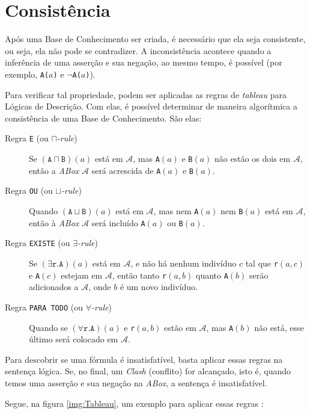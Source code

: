 \section{Consistência}

Após uma Base de Conhecimento ser criada, é necessário que ela seja consistente, ou seja, ela não pode se contradizer. A inconsistência acontece quando a inferência de uma asserção e sua negação, ao mesmo tempo, é possível (por exemplo, \texttt{A($ a $)} e $ \lnot $\texttt{A($ a $)}).

Para verificar tal propriedade, podem ser aplicadas as regras de \textit{tableau} para Lógicas de Descrição. Com elas, é possível determinar de maneira algorítmica a consistência de uma Base de Conhecimento. São elas:

\begin{description}
	\item[Regra \texttt{E} (ou \textit{$ \sqcap $-rule})] Se $(\texttt{A} \sqcap \texttt{B})(a)$ está em $ \mathcal{A} $, mas \texttt{A}$ (a) $ e \texttt{B}$ (a) $ não estão os dois em $ \mathcal{A} $, então a \textit{ABox} $ \mathcal{A} $ será acrescida de \texttt{A}$ (a) $ e \texttt{B}$ (a) $.
	\item[Regra \texttt{OU} (ou \textit{$ \sqcup $-rule})] Quando $(\texttt{A} \sqcup \texttt{B})(a)$ está em $ \mathcal{A} $, mas nem \texttt{A}$ (a) $ nem \texttt{B}$ (a) $ está em $ \mathcal{A} $, então à \textit{ABox} $ \mathcal{A} $ será incluído \texttt{A}$ (a) $ ou \texttt{B}$ (a) $.
	\item[Regra \texttt{EXISTE} (ou \textit{$ \exists $-rule})] Se $(\exists \texttt{r.A})(a)$ está em $ \mathcal{A} $, e não há nenhum indivíduo $ c $ tal que \texttt{r}$ (a,c) $ e \texttt{A}$ (c) $ estejam em $ \mathcal{A} $, então tanto \texttt{r}$ (a,b) $ quanto \texttt{A}$ (b) $ serão adicionados a $ \mathcal{A} $, onde $ b $ é um novo indivíduo.
	\item[Regra \texttt{PARA TODO} (ou \textit{$ \forall $-rule})] Quando se $(\forall \texttt{r.A})(a)$ e \texttt{r}$ (a,b) $ estão em $ \mathcal{A} $, mas \texttt{A}$ (b) $ não está, esse último será colocado em $ \mathcal{A} $.  
\end{description}

Para descobrir se uma fórmula é insatisfatível, basta aplicar essas regras na sentença lógica. Se, no final, um \textit{Clash} (conflito) for alcançado, isto é, quando temos uma asserção e sua negação na \textit{ABox}, a sentença é insatisfatível.

Segue, na figura \ref{img:Tableau}, um exemplo para aplicar essas regras \citep{logicaKoubarakis}:

